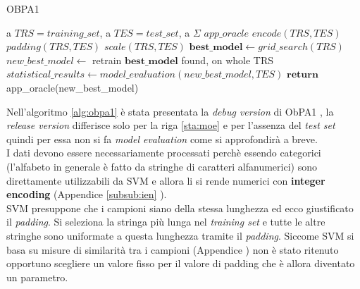 \begin{algorithm}
\caption{OBPA1}\label{alg:obpa1}
\begin{algorithmic}[1]
\Statex
\Input a $TRS = training\_set$, a $TES = test\_set$, a $\Sigma$   
\Output $app\_oracle$
\State $encode(TRS , TES)$
\State $padding(TRS , TES)$
\State $scale(TRS , TES)$
\State $\textbf{best\_model} \gets grid\_search(TRS)$ \label{sta:quattro}
\State $new\_best\_model \gets$ retrain $\textbf{best\_model}$ found, on whole TRS
\State $statistical\_results \gets model\_evaluation(new\_best\_model,TES)$ \label{sta:moe}
\State $\textbf{return}$ app\_oracle(new\_best\_model) 

   
\end{algorithmic}
\end{algorithm}
Nell'algoritmo \ref{alg:obpa1} è stata presentata la \textit{debug version} di \ac{ObPA}1 , la \textit{release version} differisce solo per la riga \ref{sta:moe} e per l'assenza del \textit{test set} quindi per essa non si fa \textit{model evaluation} come si approfondirà a breve.\\
I dati devono essere necessariamente processati perchè essendo categorici (l'alfabeto in generale è fatto da stringhe di caratteri alfanumerici) sono direttamente utilizzabili da \ac{SVM} e allora li si rende numerici con \textbf{integer encoding} (Appendice \ref{subsub:ien} ).\\
\ac{SVM} presuppone che i campioni siano della stessa lunghezza ed ecco giustificato il \textit{padding}. Si seleziona la stringa più lunga nel \textit{training set} e tutte le altre stringhe sono uniformate a questa lunghezza tramite il \textit{padding}. Siccome \ac{SVM} si basa su misure di similarità tra i campioni (Appendice \label{subsub:prscal}) non è stato ritenuto opportuno scegliere un valore fisso per il valore di padding che è allora diventato un parametro.\\
